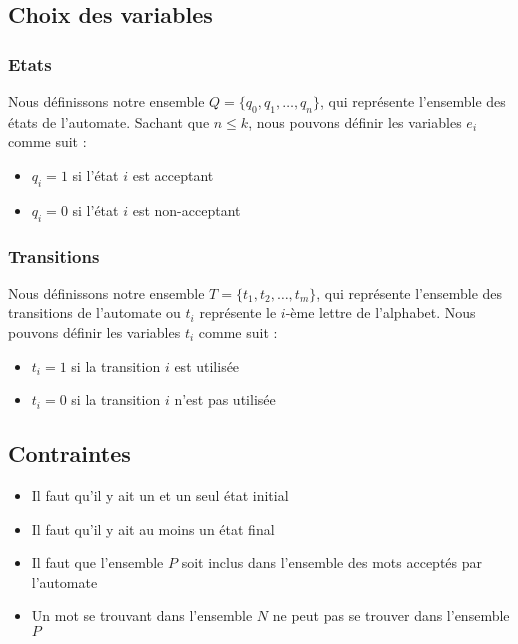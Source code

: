 \documentclass[a4paper, 12pt]{extarticle}
\begin{document}
\subsection{Choix des variables} %
\label{sub:choix_des_variables}

\subsubsection{Etats} %
\label{sec:etats}

Nous définissons notre ensemble $Q = \{q_0, q_1, \dots, q_n\}$, qui 
représente l'ensemble des états de l'automate. Sachant que $n \le k$, nous 
pouvons définir les variables $e_i$ comme suit : 
\begin{itemize}[label=$\bullet$]
    \item $q_i = 1$ si l'état $i$ est acceptant 
    \item $q_i = 0$ si l'état $i$ est non-acceptant 
\end{itemize}


\subsubsection{Transitions} %
\label{sec:transitions} 

Nous définissons notre ensemble $T = \{t_1, t_2, \dots, t_m\}$, qui représente 
l'ensemble des transitions de l'automate ou $t_i$ représente le $i$-ème lettre de 
l'alphabet. 
Nous pouvons définir les variables $t_i$ comme suit : 
\begin{itemize}[label=$\bullet$]
    \item $t_i = 1$ si la transition $i$ est utilisée 
    \item $t_i = 0$ si la transition $i$ n'est pas utilisée 
\end{itemize}

\subsection{Contraintes} %
\label{sub:contraintes}

\begin{itemize}
    \item Il faut qu'il y ait un et un seul état initial 
    \item Il faut qu'il y ait au moins un état final
    \item Il faut que l'ensemble $P$ soit inclus dans l'ensemble des mots acceptés par l'automate 
    \item Un mot se trouvant dans l'ensemble $N$ ne peut pas se trouver dans l'ensemble $P$ 
\end{itemize}
\end{document}
